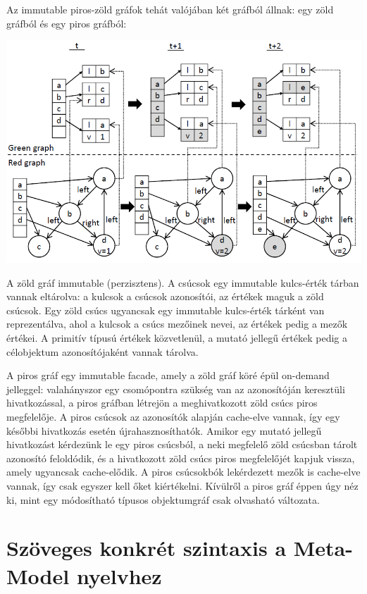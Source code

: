 \documentclass[12pt, a4paper]{report}
\begin{document}
Az immutable piros-zöld gráfok tehát valójában két gráfból állnak: egy zöld gráfból és egy piros gráfból:

\begin{center}\includegraphics[width=\textwidth]{RedGreenGraph.png}\end{center}

A zöld gráf immutable (perzisztens). A csúcsok egy immutable kulcs-érték tárban vannak eltárolva: a kulcsok a csúcsok azonosítói, az értékek maguk a zöld csúcsok. Egy zöld csúcs ugyancsak egy immutable kulcs-érték tárként van reprezentálva, ahol a kulcsok a csúcs mezőinek nevei, az értékek pedig a mezők értékei. A primitív típusú értékek közvetlenül, a mutató jellegű értékek pedig a célobjektum azonosítójaként vannak tárolva.

A piros gráf egy immutable facade, amely a zöld gráf köré épül on-demand jelleggel: valahányszor egy csomópontra szükség van az azonosítóján keresztüli hivatkozással, a piros gráfban létrejön a meghivatkozott zöld csúcs piros megfelelője. A piros csúcsok az azonosítók alapján cache-elve vannak, így egy későbbi hivatkozás esetén újrahasznosíthatók. Amikor egy mutató jellegű hivatkozást kérdezünk le egy piros csúcsból, a neki megfelelő zöld csúcsban tárolt azonosító feloldódik, és a hivatkozott zöld csúcs piros megfelelőjét kapjuk vissza, amely ugyancsak cache-elődik. A piros csúcsokbók lekérdezett mezők is cache-elve vannak, így csak egyszer kell őket kiértékelni. Kívülről a piros gráf éppen úgy néz ki, mint egy módosítható típusos objektumgráf csak olvasható változata.

\section{Szöveges konkrét szintaxis a Meta-Model nyelvhez}
\end{document}
